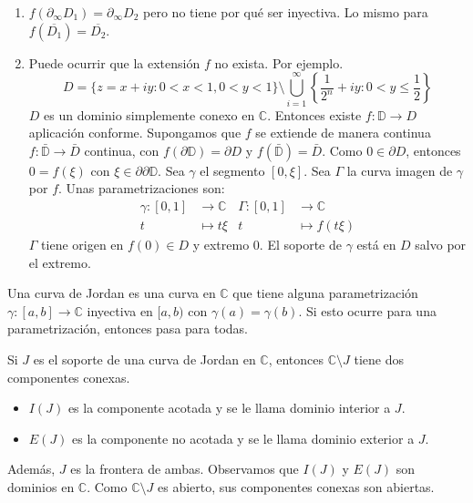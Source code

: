 \begin{remark}
    \hfill
    \begin{enumerate}
        \item $f(\partial_\infty D_1) = \partial_\infty D_2$ pero no tiene por qué ser inyectiva.
              Lo mismo para $f(\overline{D_1}) = \overline{D_2}$.
        \item Puede ocurrir que la extensión $f$ no exista.
              Por ejemplo.
              $$D = \{z = x + iy : 0 < x < 1, 0 < y < 1\} \setminus \bigcup_{i=1}^\infty \left\{\frac{1}{2^n} + iy : 0 < y \leq \frac{1}{2}\right\}$$
              $D$ es un dominio simplemente conexo en $\mathbb{C}$.
              Entonces existe $f: \mathbb{D} \to D$ aplicación conforme.
              Supongamos que $f$ se extiende de manera continua $f: \bar{\mathbb{D}} \to \bar{D}$ continua, con $f(\partial\mathbb{D}) = \partial D$ y $f(\bar{\mathbb{D}}) = \bar{D}$.
              Como $0 \in \partial D$, entonces $0 = f(\xi)$ con $\xi \in \partial \partial\mathbb{D}$.
              Sea $\gamma$ el segmento $[0, \xi]$.
              Sea $\Gamma$ la curva imagen de $\gamma$ por $f$.
              Unas parametrizaciones son:
              \begin{align*}
                  \gamma: [0, 1] & \to \mathbb{C} & \Gamma: [0, 1] & \to \mathbb{C}  \\
                  t              & \mapsto t\xi   & t              & \mapsto f(t\xi)
              \end{align*}
              $\Gamma$ tiene origen en $f(0) \in D$ y extremo 0.
              El soporte de $\gamma$ está en $D$ salvo por el extremo.
    \end{enumerate}
\end{remark}

Una curva de Jordan es una curva en $\mathbb{C}$ que tiene alguna parametrización $\gamma: [a, b] \to \mathbb{C}$ inyectiva en $[a, b)$ con $\gamma(a) = \gamma(b)$.
Si esto ocurre para una parametrización, entonces pasa para todas.

Si $J$ es el soporte de una curva de Jordan en $\mathbb{C}$, entonces $\mathbb{C} \setminus J$ tiene dos componentes conexas.
\begin{itemize}
    \item $I(J)$ es la componente acotada y se le llama dominio interior a $J$.
    \item $E(J)$ es la componente no acotada y se le llama dominio exterior a $J$.
\end{itemize}
Además, $J$ es la frontera de ambas.
Observamos que $I(J)$ y $E(J)$ son dominios en $\mathbb{C}$.
Como $\mathbb{C} \setminus J$ es abierto, sus componentes conexas son abiertas.

